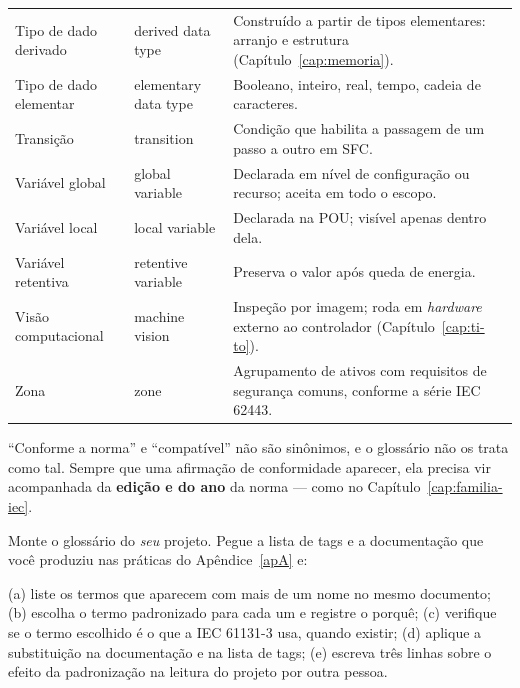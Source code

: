 \begin{longtable}{p{3.3cm} p{3.3cm} p{8.4cm}}
  Tipo de dado derivado & derived data type & Construído a partir de tipos elementares: arranjo e
    estrutura (Capítulo~\ref{cap:memoria}). \\
  Tipo de dado elementar & elementary data type & Booleano, inteiro, real, tempo, cadeia de
    caracteres. \\
  Transição & transition & Condição que habilita a passagem de um passo a outro em SFC. \\
  Variável global & global variable & Declarada em nível de configuração ou recurso; aceita em todo o
    escopo. \\
  Variável local & local variable & Declarada na POU; visível apenas dentro dela. \\
  Variável retentiva & retentive variable & Preserva o valor após queda de energia. \\
  Visão computacional & machine vision & Inspeção por imagem; roda em \emph{hardware} externo ao
    controlador (Capítulo~\ref{cap:ti-to}). \\
  Zona & zone & Agrupamento de ativos com requisitos de segurança comuns, conforme a série
    IEC 62443. \\
\end{longtable}

\begin{atencao}
``Conforme a norma'' e ``compatível'' não são sinônimos, e o glossário não os trata como tal. Sempre
que uma afirmação de conformidade aparecer, ela precisa vir acompanhada da \textbf{edição e do ano} da
norma --- como no Capítulo~\ref{cap:familia-iec}.
\end{atencao}

\begin{pratica}
Monte o glossário do \emph{seu} projeto. Pegue a lista de tags e a documentação que você produziu nas
práticas do Apêndice~\ref{apA} e:

(a) liste os termos que aparecem com mais de um nome no mesmo documento;
(b) escolha o termo padronizado para cada um e registre o porquê;
(c) verifique se o termo escolhido é o que a IEC 61131-3 usa, quando existir;
(d) aplique a substituição na documentação e na lista de tags;
(e) escreva três linhas sobre o efeito da padronização na leitura do projeto por outra pessoa.
\end{pratica}

